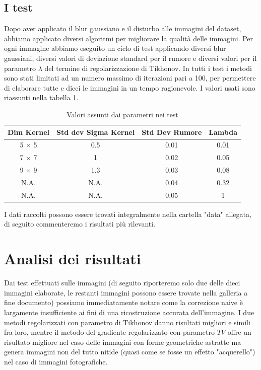 \documentclass[12pt]{article}
\begin{document}
    \subsection{I test}
    Dopo aver applicato il blur gaussiano e il disturbo alle immagini del dataset, abbiamo applicato diversi algoritmi per migliorare la qualità delle immagini. Per ogni immagine abbiamo eseguito un ciclo di test applicando diversi blur gaussiani, diversi valori di deviazione standard per il rumore e diversi valori per il parametro $\lambda$ del termine di regolarizzazione di Tikhonov. In tutti i test i metodi sono stati limitati ad un numero massimo di iterazioni pari a 100, per permettere di elaborare tutte e dieci le immagini in un tempo ragionevole. I valori usati sono riassunti nella tabella 1.
    \begin{table}
    \centering
    \begin{tabular}{||c c c c||} 
         \hline
         Dim Kernel & Std dev Sigma Kernel & Std Dev Rumore & Lambda \\ [0.5ex] 
         \hline\hline
         5 $\times$ 5 & 0.5 & 0.01 & 0.01 \\ 
         \hline
         7 $\times$ 7 & 1 & 0.02 & 0.05 \\
         \hline
         9 $\times$ 9 & 1.3 & 0.03 & 0.08 \\
         \hline
         N.A. & N.A. & 0.04 & 0.32 \\
         \hline
         N.A. & N.A. & 0.05 & 1 \\ [0.2ex] 
         \hline
    \end{tabular}
    \caption{Valori assunti dai parametri nei test}
    \label{table:1}
    \end{table}
    
    I dati raccolti possono essere trovati integralmente nella cartella "data" allegata, di seguito commenteremo i risultati più rilevanti.


\section{Analisi dei risultati}
    Dai test effettuati sulle immagini (di seguito riporteremo solo due delle dieci immagini elaborate, le restanti immagini possono essere trovate nella galleria a fine documento) possiamo immediatamente notare come la correzione naive è largamente insufficiente ai fini di una ricostruzione accurata dell'immagine. 
    I due metodi regolarizzati con parametro di Tikhonov danno risultati migliori e simili fra loro, mentre il metodo del gradiente regolarizzato con parametro $TV$ offre un risultato migliore nel caso delle immagini con forme geometriche astratte ma genera immagini non del tutto nitide (quasi come se fosse un effetto "acquerello") nel caso di immagini fotografiche.
    
\end{document}
